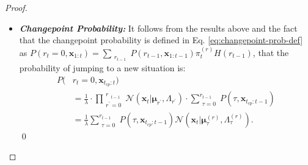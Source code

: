 \documentclass[10pt,a4paper]{amsart}
\begin{document}
\begin{proof}
\begin{itemize}[leftmargin=0.45cm]
        Therefore, the permanence probability at time $t$, given that we consider the time of the previous changepoint $t_{cp}$ to be zero, is:
        \begin{align}
            P(&r_t = r_{t-1} + 1, \boldsymbol{x}_{0:t}) \nonumber\\ &= \frac{\lambda - 1}{\lambda} \cdot \prod_{\substack{r^\prime = 0}}^{\substack{r}_{t-1}} \mathcal{N} (\boldsymbol{x}_t | \boldsymbol{\mu}_{r^\prime}, \Lambda_{r^\prime}) \cdot P(r_{t-1}, \boldsymbol{x}_{0:t-1}) \nonumber \\
            &= \frac{\lambda - 1}{\lambda} P(r_{t-1}, \boldsymbol{x}_{t_{cp}:t-1})  
                \mathcal{N} (\boldsymbol{x}_t | \boldsymbol{\mu}_{t-1}^{(r)}, \Lambda_{t-1}^{(r)}). \nonumber
        \end{align}

        \item \textit{\textbf{Changepoint Probability:}} It follows from the results above and the fact that the changepoint probability is defined in Eq. \eqref{eq:changepoint-prob-def} as $P(r_t=0, \boldsymbol{x}_{1:t}) = \sum_{\substack{r_{t-1}}} P(r_{t-1}, \boldsymbol{x}_{1:t-1}) \pi_t^{(r)} H(r_{t-1})$, that the probability of jumping to a new situation is:
        \begin{align*}
            P(&r_t = 0, \boldsymbol{x}_{t_{cp}:t}) \\ &= \frac{1}{\lambda}  \cdot \prod_{\substack{r^\prime = 0}}^{\substack{r}_{t-1}} \mathcal{N} (\boldsymbol{x}_t | \boldsymbol{\mu}_{r^\prime}, \Lambda_{r^\prime}) \cdot   \sum_{\substack{\tau = 0}}^{r_{t-1}} P(\tau, \boldsymbol{x}_{t_{cp}:t-1})  \\
            &= \frac{1}{\lambda} \sum_{\substack{\tau = 0}}^{r_{t-1}} P(\tau, \boldsymbol{x}_{t_{cp}:t-1}) 
                \mathcal{N} (\boldsymbol{x}_t | \boldsymbol{\mu}_{\tau}^{(r)}, \Lambda_{\tau}^{(r)}).
        \end{align*}
    \qed
    \end{itemize}
\end{proof}
\end{document}
